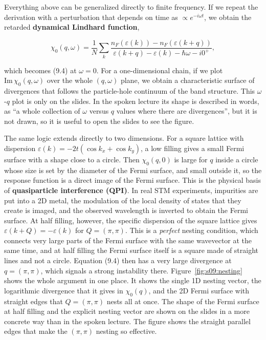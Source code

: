 Everything above can be generalized directly to finite frequency. If we repeat the derivation with a
perturbation that depends on time as $\propto e^{-i\omega t}$, we obtain the retarded
\textbf{dynamical Lindhard function},

\begin{equation}
\chi_0(q,\omega) = \frac{1}{N} \sum_k \frac{n_F(\varepsilon(k)) - n_F(\varepsilon(k+q))}{\varepsilon(k+q) - \varepsilon(k) - \hbar\omega - i0^+},
\end{equation}

which becomes (9.4) at $\omega = 0$. For a one-dimensional chain, if we plot
$\mathrm{Im}\,\chi_0(q,\omega)$ over the whole $(q,\omega)$ plane, we obtain a characteristic surface
of divergences that follows the particle-hole continuum of the band structure. This $\omega$-$q$ plot
is only on the slides. In the spoken lecture its shape is described in words, as ``a whole collection
of $\omega$ versus $q$ values where there are divergences'', but it is not drawn, so it is useful to
open the slides to see the figure.

The same logic extends directly to two dimensions. For a square lattice with dispersion
$\varepsilon(k) = -2t(\cos k_x + \cos k_y)$, a low filling gives a small Fermi surface with a shape
close to a circle. Then $\chi_0(q,0)$ is large for $q$ inside a circle whose size is set by the
diameter of the Fermi surface, and small outside it, so the response function is a direct image of
the Fermi surface. This is the physical basis of \textbf{quasiparticle interference (QPI)}. In real STM
experiments, impurities are put into a 2D metal, the modulation of the local density of states that
they create is imaged, and the observed wavelength is inverted to obtain the Fermi surface. At half
filling, however, the specific dispersion of the square lattice gives $\varepsilon(k+Q) =
-\varepsilon(k)$ for $Q=(\pi,\pi)$. This is a \emph{perfect} nesting condition, which connects very
large parts of the Fermi surface with the same wavevector at the same time, and at half filling the
Fermi surface itself is a square made of straight lines and not a circle. Equation (9.4) then has a
very large divergence at $q=(\pi,\pi)$, which signals a strong instability there.
Figure~\ref{fig:s09:nesting} shows the whole argument in one place. It shows the single 1D nesting
vector, the logarithmic divergence that it gives in $\chi_0(q)$, and the 2D Fermi surface with
straight edges that $Q=(\pi,\pi)$ nests all at once. The
shape of the Fermi surface at half filling and the explicit nesting vector are shown on the slides in
a more concrete way than in the spoken lecture. The figure shows the straight parallel edges that make the $(\pi,\pi)$ nesting so
effective.

